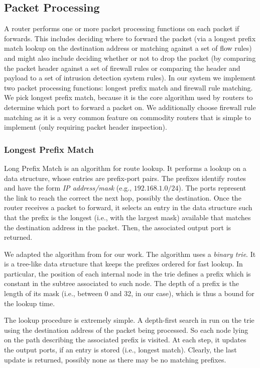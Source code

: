 \subsection{Packet Processing}

A router performs one or more packet processing functions on each packet if
forwards. This includes deciding where to forward the packet (via a longest
prefix match lookup on the destination address or matching against a set of
flow rules) and might also include deciding whether or not to drop the packet
(by comparing the packet header against a set of firewall rules or comparing
the header and payload to a set of intrusion detection system rules).  In our
system we implement two packet processing functions: longest prefix match and
firewall rule matching. We pick longest prefix match, because it is the core 
algorithm used by routers to determine which port to forward a packet on. We
additionally choose firewall rule matching as it is a very common feature on
commodity routers that is simple to implement (only requiring packet header
inspection).

\subsubsection{Longest Prefix Match}
Long Prefix Match is an algorithm for route lookup. It performs a lookup on a data structure, whose entries are prefix-port pairs. The prefixes identify routes and have the form \emph{IP address/mask} (e.g., $192.168.1.0/24$). The ports represent the link to reach the correct the next hop, possibly the destination. Once the router receives a packet to forward, it selects an entry in the data structure such that the prefix is the longest (i.e., with the largest mask) available that matches the destination address in the packet. Then, the associated output port is returned. 

We adapted the algorithm from \cite{sdstrowes} for our work. The algorithm uses a \emph{binary trie}. It is a tree-like data structure that keeps the prefixes ordered for fast lookup. In particular, the position of each internal node in the trie defines a prefix which is constant in the subtree associated to such node. The depth of a prefix is the length of its mask (i.e., between 0 and 32, in our case), which is thus a bound for the lookup time.

The lookup procedure is extremely simple. A depth-first search in run on the trie using the destination address of the packet being processed. So each node lying on the path describing the associated prefix is visited. At each step, it updates the output ports, if an entry is stored (i.e., longest match). Clearly, the last update is returned, possibly none as there may be no matching prefixes. 

